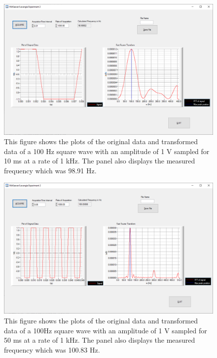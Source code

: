 \documentclass{article}
\begin{document}
\begin{figure}[H]
\includegraphics[scale=0.39,center]{Square10ms.png}
\caption{This figure shows the plots of the original data and transformed data of a 100 Hz square wave with an amplitude of 1 V sampled for 10 ms at a rate of 1 kHz.  The panel also displays the measured frequency which was 98.91 Hz.}
\end{figure}


\begin{figure}[H]
\includegraphics[scale=0.39,center]{Square50ms.png}
\caption{This figure shows the plots of the original data and transformed data of a 100Hz square wave with an amplitude of 1 V sampled for 50 ms at a rate of 1 kHz.  The panel also displays the measured frequency which was 100.83 Hz.}
\end{figure}
\end{document}
